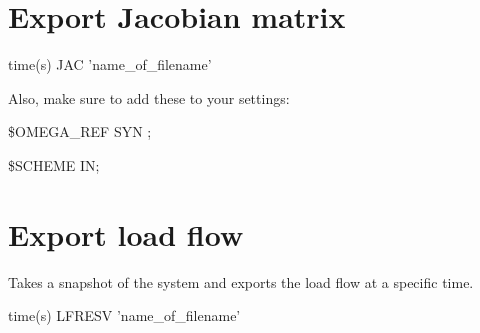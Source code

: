 \section{Export Jacobian matrix}

time(s) JAC 'name\_of\_filename' 

Also, make sure to add these to your settings:

\$OMEGA\_REF SYN ;
	
\$SCHEME IN;


\section{Export load flow}

Takes a snapshot of the system and exports the load flow at a specific time.

time(s) LFRESV 'name\_of\_filename' 